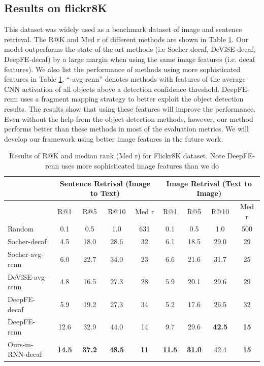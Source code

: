 \subsection{Results on flickr8K}

This dataset was widely used as a benchmark dataset of image and sentence retrieval.
The R@K and Med r of different methods are shown in Table \ref{tab:flickr8K_ret}.
Our model outperforms the state-of-the-art methods (i.e Socher-decaf, DeViSE-decaf, DeepFE-decaf) by a large margin when using the same image features (i.e. decaf features).
We also list the performance of methods using more sophisticated features in Table \ref{tab:flickr8K_ret}.
``-avg-rcnn'' denotes methods with features of the average CNN activation of all objects above a detection confidence threshold.
DeepFE-rcnn \cite{karpathy2014fragment} uses a fragment mapping strategy to better exploit the object detection results.
The results show that using these features will improve the performance.
Even without the help from the object detection methods, however, our method performs better than these methods in most of the evaluation metrics.
We will develop our framework using better image features in the future work.

\begin{table}[htb]
	\centering
\begin{tabular}{l|cccc|cccc}
\hline
      & \multicolumn{4}{c|}{Sentence Retrival (Image to Text)} & \multicolumn{4}{c}{Image Retrival (Text to Image)} \\
\hline
      & R@1   & R@5   & R@10  & Med r & R@1   & R@5   & R@10  & Med r \\
\hline
Random & 0.1   & 0.5   & 1.0   & 631   & 0.1   & 0.5   & 1.0   & 500 \\
Socher-decaf \cite{socher2014grounded} & 4.5   & 18.0  & 28.6  & 32    & 6.1   & 18.5  & 29.0  & 29 \\
Socher-avg-rcnn \cite{socher2014grounded} & 6.0   & 22.7  & 34.0  & 23    & 6.6   & 21.6  & 31.7  & 25 \\
DeViSE-avg-rcnn \cite{frome2013devise} & 4.8   & 16.5  & 27.3  & 28    & 5.9   & 20.1  & 29.6  & 29 \\
DeepFE-decaf \cite{karpathy2014fragment} & 5.9   & 19.2  & 27.3  & 34    & 5.2   & 17.6  & 26.5  & 32 \\
DeepFE-rcnn \cite{karpathy2014fragment} & 12.6  & 32.9  & 44.0  & 14    & 9.7   & 29.6  & \textbf{42.5} & \textbf{15} \\
Ours-m-RNN-decaf & \textbf{14.5} & \textbf{37.2} & \textbf{48.5} & \textbf{11} & \textbf{11.5} & \textbf{31.0} & 42.4  & \textbf{15}\\
\hline
\end{tabular}%
	\caption{Results of R@K and median rank (Med r) for Flickr8K dataset. Note DeepFE-rcnn uses more sophisticated image features than we do}
	\label{tab:flickr8K_ret}
\end{table}

